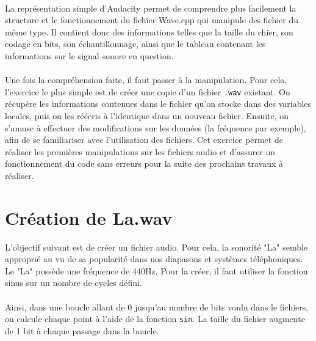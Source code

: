 \documentclass[a4paper,11pt]{article}
\begin{document}
\paragraph{} La représentation simple d'Audacity permet de comprendre plus facilement la structure et le fonctionnement du fichier Wave.cpp qui manipule des fichier du même type. Il contient donc des informations telles que la taille du chier, son codage en bits, son échantillonnage, ainsi que le tableau contenant les informations sur le signal sonore en question.

\paragraph{} Une fois la compréhension faite, il faut passer à la manipulation. Pour cela, l'exercice le plus simple est de créer une copie d'un fichier \texttt{.wav} existant. On récupère les informations contenues dans le fichier qu'on stocke dans des variables locales, puis on les réécris à l'identique dans un nouveau fichier. Ensuite, on s'amuse à effectuer des modifications sur les données (la fréquence par exemple), afin de se familiariser avec l'utilisation des fichiers. Cet exercice permet de réaliser les premières manipulations sur les fichiers audio et d'assurer un fonctionnement du code sans erreurs pour la suite des prochains travaux à réaliser.

\section{Création de La.wav}
L'objectif suivant est de créer un fichier audio. Pour cela, la sonorité "La" semble approprié au vu de sa popularité dans nos diapasons et systèmes téléphoniques. Le "La" possède une fréquence de 440Hz. Pour la créer, il faut utiliser la fonction sinus sur un nombre de cycles défini.

\paragraph{} Ainsi, dans une boucle allant de 0 jusqu'au nombre de bits voulu dans le fichiers, on calcule chaque point à l'aide de la fonction \texttt{sin}. La taille du fichier augmente de 1 bit à chaque passage dans la boucle.
\end{document}
